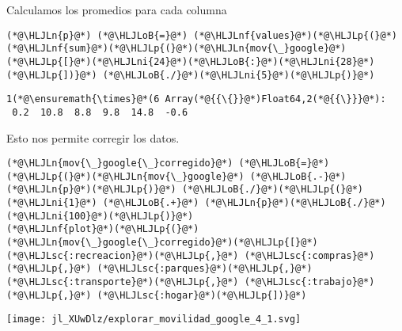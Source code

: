 \documentclass[12pt,a4paper]{article}
\newcommand{\HLJLn}[1]{#1}
\newcommand{\HLJLnf}[1]{\textcolor[RGB]{66,102,213}{#1}}
\newcommand{\HLJLsc}[1]{\textcolor[RGB]{201,61,57}{#1}}
\newcommand{\HLJLni}[1]{\textcolor[RGB]{59,151,46}{#1}}
\newcommand{\HLJLoB}[1]{\textcolor[RGB]{102,102,102}{\textbf{#1}}}
\newcommand{\HLJLp}[1]{#1}
\begin{document}
Calculamos los promedios para cada columna


\begin{lstlisting}
(*@\HLJLn{p}@*) (*@\HLJLoB{=}@*) (*@\HLJLnf{values}@*)(*@\HLJLp{(}@*)(*@\HLJLnf{sum}@*)(*@\HLJLp{(}@*)(*@\HLJLn{mov{\_}google}@*)(*@\HLJLp{[}@*)(*@\HLJLni{24}@*)(*@\HLJLoB{:}@*)(*@\HLJLni{28}@*)(*@\HLJLp{])}@*) (*@\HLJLoB{./}@*)(*@\HLJLni{5}@*)(*@\HLJLp{)}@*)
\end{lstlisting}

\begin{lstlisting}
1(*@\ensuremath{\times}@*(6 Array(*@{{\{}}@*)Float64,2(*@{{\}}}@*):
 0.2  10.8  8.8  9.8  14.8  -0.6
\end{lstlisting}


Esto nos permite corregir los datos.


\begin{lstlisting}
(*@\HLJLn{mov{\_}google{\_}corregido}@*) (*@\HLJLoB{=}@*) (*@\HLJLp{(}@*)(*@\HLJLn{mov{\_}google}@*) (*@\HLJLoB{.-}@*) (*@\HLJLn{p}@*)(*@\HLJLp{)}@*) (*@\HLJLoB{./}@*)(*@\HLJLp{(}@*)(*@\HLJLni{1}@*) (*@\HLJLoB{.+}@*) (*@\HLJLn{p}@*)(*@\HLJLoB{./}@*)(*@\HLJLni{100}@*)(*@\HLJLp{)}@*)
(*@\HLJLnf{plot}@*)(*@\HLJLp{(}@*)(*@\HLJLn{mov{\_}google{\_}corregido}@*)(*@\HLJLp{[}@*)(*@\HLJLsc{:recreacion}@*)(*@\HLJLp{,}@*) (*@\HLJLsc{:compras}@*)(*@\HLJLp{,}@*) (*@\HLJLsc{:parques}@*)(*@\HLJLp{,}@*) (*@\HLJLsc{:transporte}@*)(*@\HLJLp{,}@*) (*@\HLJLsc{:trabajo}@*)(*@\HLJLp{,}@*) (*@\HLJLsc{:hogar}@*)(*@\HLJLp{])}@*)
\end{lstlisting}

\texttt{[image: jl\_XUwDlz/explorar\_movilidad\_google\_4\_1.svg]}
\end{document}
